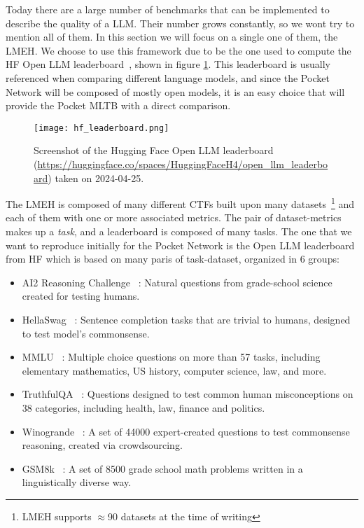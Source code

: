 Today there are a large number of benchmarks that can be implemented to describe the quality of a \gls{LLM}. Their number grows constantly, so we wont try to mention all of them. In this section we will focus on a single one of them, the \gls{LMEH}.
We choose to use this framework due to be the one used to compute the \gls{HF} Open \gls{LLM} leaderboard~\cite{open-llm-leaderboard}, shown in figure \ref{fig:hf_leaderboard}. This leaderboard is usually referenced when comparing different language models, and since the Pocket Network will be composed of mostly open models, it is an easy choice that will provide the Pocket \gls{MLTB} with a direct comparison.

\begin{figure}[H]
    \centering
    \texttt{[image: hf\_leaderboard.png]}
    \caption{Screenshot of the Hugging Face Open LLM leaderboard (\url{https://huggingface.co/spaces/HuggingFaceH4/open_llm_leaderboard}) taken on 2024-04-25.}
    \label{fig:hf_leaderboard}
\end{figure}

The \gls{LMEH} is composed of many different \glspl{CTF} built upon many datasets~\footnote{\gls{LMEH} supports $\approx$90 datasets at the time of writing} and each of them with one or more associated metrics. The pair of dataset-metrics makes up a \emph{task}, and a leaderboard is composed of many tasks. The one that we want to reproduce initially for the Pocket Network is the Open \gls{LLM} leaderboard from \gls{HF} which is based on many paris of task-dataset, organized in 6 groups:
\begin{itemize}
    \item AI2 Reasoning Challenge~\cite{clark2018think} : Natural questions from grade-school science created for testing humans.
    \item HellaSwag~\cite{zellers2019hellaswag} : Sentence completion tasks that are trivial to humans, designed to test model's commonsense.
    \item MMLU~\cite{hendrycks2020measuring} : Multiple choice questions on more than 57 tasks, including elementary mathematics, US history, computer science, law, and more.
    \item TruthfulQA~\cite{lin2021truthfulqa} : Questions designed to test common human misconceptions on 38 categories, including health, law, finance and politics.
    \item Winogrande~\cite{sakaguchi2019adversarial} : A set of 44000 expert-created questions to test commonsense reasoning, created via crowdsourcing.
    \item GSM8k~\cite{cobbe2021training} : A set of 8500 grade school math problems written in a linguistically diverse way.
\end{itemize}

